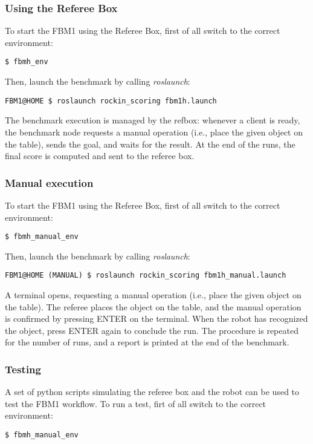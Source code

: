\documentclass[a4paper]{article}
\begin{document}
\subsubsection{Using the Referee Box}

To start the FBM1 using the Referee Box, first of all switch to the correct environment:
\begin{verbatim}
$ fbmh_env
\end{verbatim} 

Then, launch the benchmark by calling \emph{roslaunch}:
\begin{verbatim}
FBM1@HOME $ roslaunch rockin_scoring fbm1h.launch
\end{verbatim}

The benchmark execution is managed by the refbox: whenever a client is ready, the benchmark node requests a manual operation (i.e., place the given object on the table), sends the goal, and waits for the result.
At the end of the runs, the final score is computed and sent to the referee box.

\subsubsection{Manual execution}

To start the FBM1 using the Referee Box, first of all switch to the correct environment:
\begin{verbatim}
$ fbmh_manual_env
\end{verbatim} 

Then, launch the benchmark by calling \emph{roslaunch}:
\begin{verbatim}
FBM1@HOME (MANUAL) $ roslaunch rockin_scoring fbm1h_manual.launch
\end{verbatim} 

A terminal opens, requesting a manual operation (i.e., place the given object on the table).
The referee places the object on the table, and the manual operation is confirmed by pressing ENTER on the terminal.
When the robot has recognized the object, press ENTER again to conclude the run.
The procedure is repeated for the number of runs, and a report is printed at the end of the benchmark.

\subsubsection{Testing}

A set of python scripts simulating the referee box and the robot can be used to test the FBM1 workflow.
To run a test, firt of all switch to the correct environment:
\begin{verbatim}
$ fbmh_manual_env
\end{verbatim} 
\end{document}
